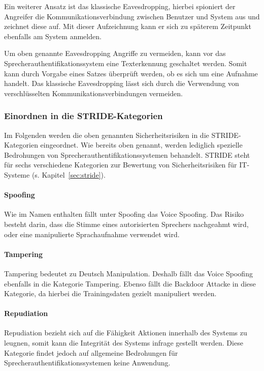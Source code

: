 Ein weiterer Ansatz ist das klassische Eavesdropping, hierbei spioniert der Angreifer die Kommunikationsverbindung zwischen Benutzer und System aus und zeichnet diese auf.
Mit dieser Aufzeichnung kann er sich zu späterem Zeitpunkt ebenfalls am System anmelden.

Um oben genannte Eavesdropping Angriffe zu vermeiden, kann vor das Sprecherauthentifikationssystem eine Texterkennung geschaltet werden.
Somit kann durch Vorgabe eines Satzes überprüft werden, ob es sich um eine Aufnahme handelt.
Das klassische Eavesdropping lässt sich durch die Verwendung von verschlüsselten Kommunikationsverbindungen vermeiden.

\subsubsection{Einordnen in die STRIDE-Kategorien}

\textauthor{\vJB,}{\vLB}{}

Im Folgenden werden die oben genannten Sicherheitsrisiken in die STRIDE-Kategorien eingeordnet.
Wie bereits oben genannt, werden lediglich spezielle Bedrohungen von Sprecherauthentifikationssystemen behandelt.
STRIDE steht für sechs verschiedene Kategorien zur Bewertung von Sicherheitsrisiken für IT-Systeme (s. Kapitel~\ref{sec:stride}).
\paragraph{Spoofing}
Wie im Namen enthalten fällt unter Spoofing das Voice Spoofing.
Das Risiko besteht darin, dass die Stimme eines autorisierten Sprechers nachgeahmt wird, oder eine manipulierte Sprachaufnahme verwendet wird.

\paragraph{Tampering}
Tampering bedeutet zu Deutsch Manipulation.
Deshalb fällt das Voice Spoofing ebenfalls in die Kategorie Tampering.
Ebenso fällt die Backdoor Attacke in diese Kategorie, da hierbei die Trainingsdaten gezielt manipuliert werden.

\paragraph{Repudiation}
Repudiation bezieht sich auf die Fähigkeit Aktionen innerhalb des Systems zu leugnen, somit kann die Integrität des Systems infrage gestellt werden.
Diese Kategorie findet jedoch auf allgemeine Bedrohungen für Sprecherauthentifikationssystemen keine Anwendung.

